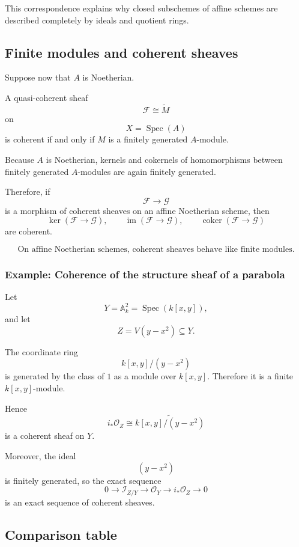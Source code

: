 \documentclass[12pt,a4paper]{article}
\theoremstyle{notespace}
\begin{document}
This correspondence explains why closed subschemes of affine schemes are
described completely by ideals and quotient rings.

\subsection{Finite modules and coherent sheaves}

Suppose now that \(A\) is Noetherian.

A quasi-coherent sheaf
\[
\mathcal{F}\cong\widetilde{M}
\]
on
\[
X=\operatorname{Spec}(A)
\]
is coherent if and only if \(M\) is a finitely generated \(A\)-module.

Because \(A\) is Noetherian, kernels and cokernels of homomorphisms between
finitely generated \(A\)-modules are again finitely generated.

Therefore, if
\[
\mathcal{F}
\longrightarrow
\mathcal{G}
\]
is a morphism of coherent sheaves on an affine Noetherian scheme, then
\[
\ker(\mathcal{F}\to\mathcal{G}),
\qquad
\operatorname{im}(\mathcal{F}\to\mathcal{G}),
\qquad
\operatorname{coker}(\mathcal{F}\to\mathcal{G})
\]
are coherent.

\[
\boxed{
	\text{On affine Noetherian schemes, coherent sheaves behave like finite modules.}
}
\]

\subsubsection{Example: Coherence of the structure sheaf of a parabola}

Let
\[
Y=\mathbb{A}^{2}_{k}=\operatorname{Spec}(k[x,y]),
\]
and let
\[
Z=V(y-x^{2})\subseteq Y.
\]

The coordinate ring
\[
k[x,y]/(y-x^{2})
\]
is generated by the class of \(1\) as a module over \(k[x,y]\).
Therefore it is a finite \(k[x,y]\)-module.

Hence
\[
i_{*}\mathcal{O}_{Z}
\cong
\widetilde{k[x,y]/(y-x^{2})}
\]
is a coherent sheaf on \(Y\).

Moreover, the ideal
\[
(y-x^{2})
\]
is finitely generated, so the exact sequence
\[
0
\longrightarrow
\mathcal{I}_{Z/Y}
\longrightarrow
\mathcal{O}_{Y}
\longrightarrow
i_{*}\mathcal{O}_{Z}
\longrightarrow
0
\]
is an exact sequence of coherent sheaves.

\subsection{Comparison table}
\end{document}
